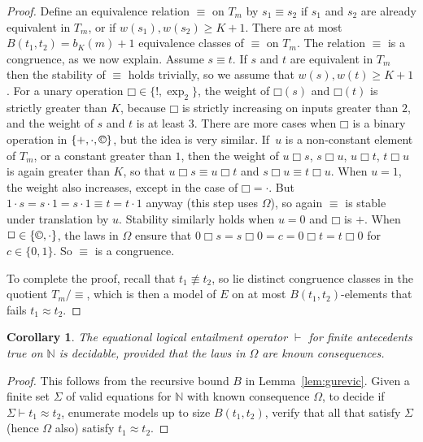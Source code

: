 \documentclass[eqnor,reqno]{amsart}
\theoremstyle{plain}
\newtheorem{cor}[thm]{Corollary}
\theoremstyle{definition}
\newcommand{\cc}{\mathbin{\textup{\copyright}}}
\newcommand{\bbox}{\mathbin{\Box}}
\begin{document}
\begin{proof}
 
Define an equivalence relation $\equiv$ on $T_m$ by $s_1\equiv s_2$ if $s_1$ and $s_2$ are already equivalent in $T_m$, or if $w(s_1), w(s_2)\geq K+1$.  
There are at most $B(t_1,t_2)=b_K(m)+1$ equivalence classes of $\equiv$ on $T_m$.   
The relation $\equiv$ is a congruence, as we now explain.  Assume $s\equiv t$.  If $s$ and $t$ are equivalent in $T_m$ then the stability of $\equiv$ holds trivially, so we assume that $w(s), w(t)\geq K+1$.  
For a unary operation $\bbox\in \{!,\exp_2\}$, the weight of $\bbox(s)$ and $\bbox(t)$ is strictly greater than $K$, because $\bbox$ is strictly increasing on inputs greater than $2$, and the weight of $s$ and $t$ is at least $3$.  
There are more cases when $\bbox$ is a binary operation in $\{+,\cdot,\cc\}$, but the idea is very similar.  
If~$u$ is a non-constant element of $T_m$, or a constant greater than $1$, then the weight of  $u\bbox s$, $s\bbox u$, $u\bbox t$, $t\bbox u$ is again greater than $K$, so that $u\bbox s\equiv u\bbox t$ and $s\bbox u\equiv t\bbox u$. 
When $u=1$, the weight also increases, except in the case of $\bbox=\cdot$.  
But $1\cdot s=s\cdot 1=s\cdot 1\equiv t=t\cdot 1$ anyway (this step uses $\Omega$), so again $\equiv$ is stable under translation by $u$.  
Stability similarly holds when $u=0$ and $\bbox$ is $+$.  
When $\bbox\in \{\cc,\cdot\}$, the laws in $\Omega$ ensure that $0\bbox s=s\bbox 0=c=0\bbox t=t\bbox 0$ for $c\in \{0,1\}$.  
So $\equiv$ is a congruence.  

To complete the proof, recall that $t_1\not\equiv t_2$, so lie distinct congruence classes in the quotient $T_m/{\equiv}$, which is then a  model of $E$ on at most $B(t_1,t_2)$-elements that fails $t_1\approx t_2$.  
\end{proof}
\begin{cor}\label{cor:entailment}
The equational logical entailment operator $\vdash$ for finite antecedents true on $\mathbb{N}$ is decidable, provided that the laws in $\Omega$ are known consequences.
\end{cor}
\begin{proof}
This follows from the recursive bound $B$ in Lemma~\ref{lem:gurevic}. Given a finite set $\Sigma$ of valid equations for $\mathbb{N}$ with known consequence $\Omega$, to decide if $\Sigma\vdash t_1\approx t_2$, enumerate models up to size $B(t_1,t_2)$, verify that all that satisfy $\Sigma$ (hence $\Omega$ also) satisfy $t_1\approx t_2$.
\end{proof}
\end{document}
